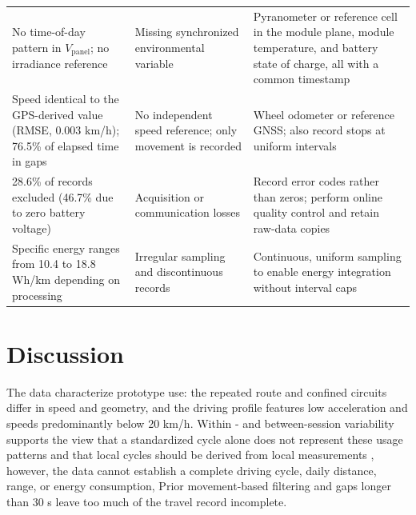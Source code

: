 \documentclass[vehicles,article,submit,moreauthors]{Definitions/mdpi}
\begin{document}
\begin{table}[H]
\begin{tabular}{p{4.0cm} p{3.9cm} p{5.6cm}}
        No time-of-day pattern in $V_{\mathrm{panel}}$; no irradiance reference
                         & Missing synchronized environmental variable
                         & Pyranometer or reference cell in the module plane, module temperature, and battery state of charge, all with a common timestamp                                                                                                           \\
        Speed identical to the GPS-derived value (RMSE, 0.003 km/h); 76.5\% of elapsed time in gaps
                         & No independent speed reference; only movement is recorded
                         & Wheel odometer or reference GNSS; also record stops at uniform intervals                                                                                                                                                                  \\
        28.6\% of records excluded (46.7\% due to zero battery voltage)
                         & Acquisition or communication losses
                         & Record error codes rather than zeros; perform online quality control and retain raw-data copies                                                                                                                                           \\
        Specific energy ranges from 10.4 to 18.8 Wh/km depending on processing
                         & Irregular sampling and discontinuous records
                         & Continuous, uniform sampling to enable energy integration without interval caps                                                                                                                                                           \\
        \bottomrule
    \end{tabular}
\end{table}

\section{Discussion}

The data characterize prototype use: the repeated route and confined circuits differ in speed and geometry, and the driving profile features low acceleration and speeds predominantly below 20 km/h. Within - and between-session variability supports the view that a standardized cycle alone does not represent these usage patterns and that local cycles should be derived from local measurements \citep{ref-pfriem,ref-brady,ref-uberti}, however, the data cannot establish a complete driving cycle, daily distance, range, or energy consumption, Prior movement-based filtering and gaps longer than 30 s leave too much of the travel record incomplete.
\end{document}

